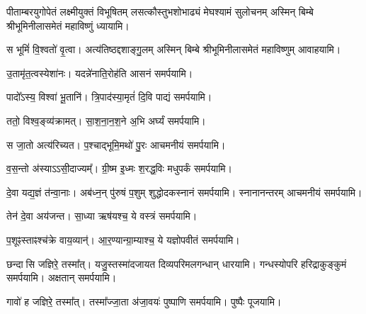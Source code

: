 \begin{center}


{पीताम्बरयुगोपेतं लक्ष्मीयुक्तं विभूषितम्}
{लसत्कौस्तुभशोभाढ्यं मेघश्यामं सुलोचनम्}
अस्मिन् बिम्बे श्रीभूमिनीलासमेतं महाविष्णुं ध्यायामि।
\medskip

{स भूमिं॑ वि॒श्वतो॑ वृ॒त्वा। अत्य॑तिष्ठद्दशाङ्गु॒लम्}
अस्मिन् बिम्बे श्रीभूमिनीलासमेतं महाविष्णुम् आवाहयामि।
\medskip

{उ॒तामृ॑त॒त्वस्येशा॑नः। यदन्ने॑नाति॒रोह॑ति}
आसनं समर्पयामि।\medskip

{पादो᳚ऽस्य॒ विश्वा॑ भू॒तानि॑। त्रि॒पाद॑स्या॒मृतं॑ दि॒वि}
पाद्यं समर्पयामि।\medskip

{ततो॒ विश्व॒ङ्व्य॑क्रामत्। सा॒श॒ना॒न॒श॒ने अ॒भि}
अर्घ्यं समर्पयामि।\medskip

{स जा॒तो अत्य॑रिच्यत। प॒श्चाद्भूमि॒मथो॑ पु॒रः}
आचमनीयं समर्पयामि।\medskip

{व॒स॒न्तो अ॑स्याऽऽसी॒दाज्यम्᳚। ग्री॒ष्म इ॒ध्मः श॒रद्ध॒विः}
मधुपर्कं समर्पयामि।\medskip

{दे॒वा यद्य॒ज्ञं त॑न्वा॒नाः। अब॑ध्न॒न् पु॑रुषं प॒शुम्}
शुद्धोदकस्नानं समर्पयामि। स्नानानन्तरम् आचमनीयं समर्पयामि।\medskip

{तेन॑ दे॒वा अय॑जन्त। सा॒ध्या ऋष॑यश्च॒ ये}
वस्त्रं समर्पयामि।\medskip

{प॒शूꣴस्ताꣴश्च॑क्रे वाय॒व्यान्॑। आ॒र॒ण्यान्ग्रा॒म्याश्च॒ ये}
यज्ञोपवीतं समर्पयामि।\medskip

{छन्दासि जज्ञिरे॒ तस्मा᳚त्। यजु॒स्तस्मा॑दजायत}
दिव्यपरिमलगन्धान् धारयामि। गन्धस्योपरि हरिद्राकुङ्कुमं समर्पयामि। अक्षतान् समर्पयामि।\medskip

{गावो॑ ह जज्ञिरे॒ तस्मा᳚त्। तस्मा᳚ज्जा॒ता अ॑जा॒वयः॑}
पुष्पाणि समर्पयामि।  पुष्पैः पूजयामि।


\end{center}
